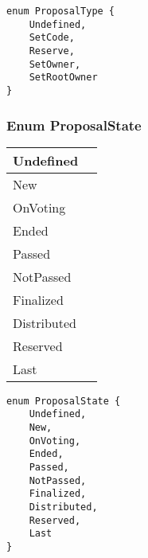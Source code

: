 \begin{lstlisting}[firstnumber=13]
enum ProposalType {
    Undefined,
    SetCode,
    Reserve,
    SetOwner,
    SetRootOwner
}
\end{lstlisting}

\subsubsection{Enum ProposalState}


\ifsoltables
\noindent\begin{tabular}{|l|p{6cm}|}\hline
Undefined & \\\hline
New & \\\hline
OnVoting & \\\hline
Ended & \\\hline
Passed & \\\hline
NotPassed & \\\hline
Finalized & \\\hline
Distributed & \\\hline
Reserved & \\\hline
Last & \\\hline
\end{tabular}
\fi


\begin{lstlisting}[firstnumber=21]
enum ProposalState {
    Undefined,
    New,
    OnVoting,
    Ended,
    Passed,
    NotPassed,
    Finalized,
    Distributed,
    Reserved,
    Last
}
\end{lstlisting}
